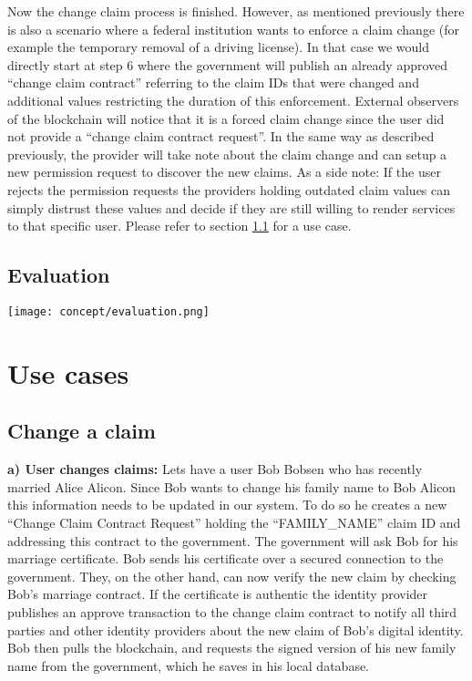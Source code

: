 Now the change claim process is finished. However, as mentioned previously there is also a scenario where a federal institution wants to enforce a claim change (for example the temporary removal of a driving license). In that case we would directly start at step 6 where the government will publish an already approved “change claim contract” referring to the claim IDs that were changed and additional values restricting the duration of this enforcement. External observers of the blockchain will notice that it is a forced claim change since the user did not provide a “change claim contract request”. In the same way as described previously, the provider will take note about the claim change and can setup a new permission request to discover the new claims. As a side note: If the user rejects the permission requests the providers holding outdated claim values can simply distrust these values and decide if they are still willing to render services to that specific user. Please refer to section \ref{sec:changeClaimUseCase} for a use case.

\subsection{Evaluation}

\texttt{[image: concept/evaluation.png]}
 
\section{Use cases}

\subsection{Change a claim}
\label{sec:changeClaimUseCase}
\textbf{a) User changes claims:}
Lets have a user Bob Bobsen who has recently married Alice Alicon. Since Bob wants to change his family name to Bob Alicon this information needs to be updated in our system. To do so he creates a new “Change Claim Contract Request” holding the “FAMILY\_NAME” claim ID and addressing this contract to the government. The government will ask Bob for his marriage certificate. Bob sends his certificate over a secured connection to the government. They, on the other hand, can now verify the new claim by checking Bob's marriage contract. If the certificate is authentic the identity provider publishes an approve transaction to the change claim contract to notify all third parties and other identity providers about the new claim of Bob's digital identity.
Bob then pulls the blockchain, and requests the signed version of his new family name from the government, which he saves in his local database.

